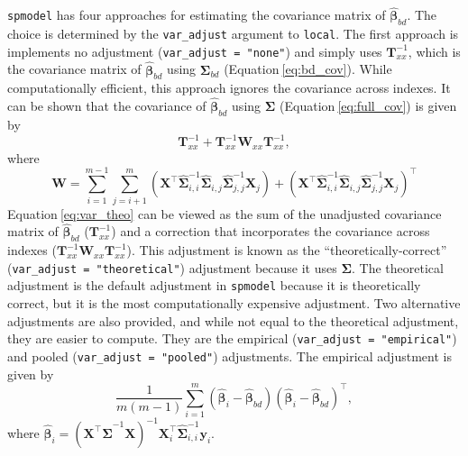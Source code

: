 \documentclass{article}
\begin{document}
\texttt{spmodel} has four approaches for estimating the covariance
matrix of \(\hat{\boldsymbol{\beta}}_{bd}\). The choice is determined by
the \texttt{var\_adjust} argument to \texttt{local}. The first approach
is implements no adjustment (\texttt{var\_adjust\ =\ "none"}) and simply
uses \(\mathbf{T}_{xx}^{-1}\), which is the covariance matrix of
\(\hat{\boldsymbol{\beta}}_{bd}\) using \(\boldsymbol{\Sigma}_{bd}\)
(Equation\(~\)\ref{eq:bd_cov}). While computationally efficient, this
approach ignores the covariance across indexes. It can be shown that the
covariance of \(\hat{\boldsymbol{\beta}}_{bd}\) using
\(\boldsymbol{\Sigma}\) (Equation\(~\)\ref{eq:full_cov}) is given by
\begin{equation}\label{eq:var_theo}
  \mathbf{T}_{xx}^{-1} + \mathbf{T}_{xx}^{-1} \mathbf{W}_{xx}\mathbf{T}_{xx}^{-1},
\end{equation} where \begin{equation*}
\mathbf{W} = \sum_{i = 1}^{m - 1} \sum_{j = i + 1}^m (\mathbf{X}^\top \hat{\boldsymbol{\Sigma}}^{-1}_{i, i} \hat{\boldsymbol{\Sigma}}_{i, j} \hat{\boldsymbol{\Sigma}}^{-1}_{j, j} \mathbf{X}_j) + (\mathbf{X}^\top \hat{\boldsymbol{\Sigma}}^{-1}_{i, i} \hat{\boldsymbol{\Sigma}}_{i, j} \hat{\boldsymbol{\Sigma}}^{-1}_{j, j} \mathbf{X}_j)^\top
\end{equation*} Equation\(~\)\ref{eq:var_theo} can be viewed as the sum
of the unadjusted covariance matrix of \(\hat{\boldsymbol{\beta}}_{bd}\)
(\(\mathbf{T}_{xx}^{-1}\)) and a correction that incorporates the
covariance across indexes
(\(\mathbf{T}_{xx}^{-1} \mathbf{W}_{xx}\mathbf{T}_{xx}^{-1}\)). This
adjustment is known as the ``theoretically-correct''
(\texttt{var\_adjust\ =\ "theoretical"}) adjustment because it uses
\(\boldsymbol{\Sigma}\). The theoretical adjustment is the default
adjustment in \texttt{spmodel} because it is theoretically correct, but
it is the most computationally expensive adjustment. Two alternative
adjustments are also provided, and while not equal to the theoretical
adjustment, they are easier to compute. They are the empirical
(\texttt{var\_adjust\ =\ "empirical"}) and pooled
(\texttt{var\_adjust\ =\ "pooled"}) adjustments. The empirical
adjustment is given by \begin{equation*}
\frac{1}{m(m -1)} \sum_{i = 1}^m (\boldsymbol{\hat{\beta}}_i - \boldsymbol{\hat{\beta}}_{bd})(\boldsymbol{\hat{\beta}}_i - \boldsymbol{\hat{\beta}}_{bd})^\top,
\end{equation*} where
\(\boldsymbol{\hat{\beta}}_i = (\mathbf{X}^\top \hat{\boldsymbol{\Sigma}}^{-1} \mathbf{X})^{-1}\mathbf{X}_i^\top \hat{\boldsymbol{\Sigma}}^{-1}_{i, i} \mathbf{y}_i\).
\end{document}
